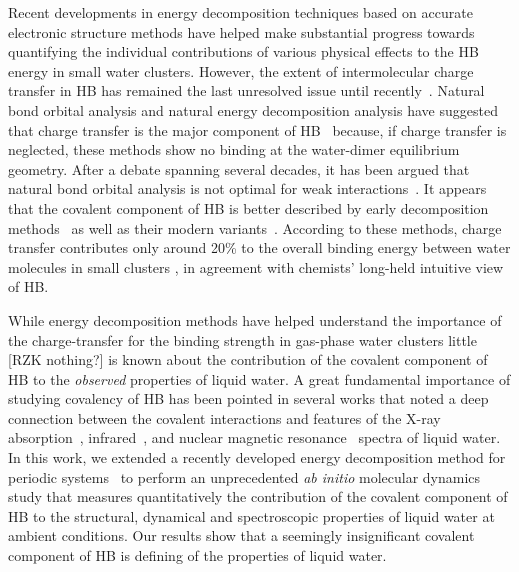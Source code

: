 \documentclass[aps,prl,reprint,amsmath,amssymb]{revtex4-1}
\begin{document}
Recent developments in energy decomposition techniques based on accurate electronic structure methods have helped make substantial progress towards quantifying the individual contributions of various physical effects to the HB energy in small water clusters. However, the extent of intermolecular charge transfer in HB has remained the last unresolved issue until recently~\cite{isaacs1999covalency,ghanty2000hydrogen,stone2017natural}. Natural bond orbital analysis\cite{weinhold1998natural} and natural energy decomposition analysis \cite{glendening1994natural} have suggested that charge transfer is the major component of HB~\cite{schenter1996natural,glendening2005natural,weinhold2005resonance} because, if charge transfer is neglected, these methods show no binding at the water-dimer equilibrium geometry. After a debate spanning several decades, it has been argued that natural bond orbital analysis is not optimal for weak interactions~\cite{stone2017natural}. It appears that the covalent component of HB is better described by early decomposition methods~\cite{kitaura1976new,bagus1984new,bagus1992decomposition,stevens1987frozen,chen1996energy,ZZZ-SAPT} as well as their modern variants~\cite{mo2000energy,misquitta2003dispersion,khaliullin2007unravelling}. According to these methods, charge transfer contributes only around 20\% to the overall binding energy between water molecules in small clusters \cite{stevens1987frozen,chen1996energy,piquemal2005csov,khaliullin2009electron,cobar2012examination}, in agreement with chemists' long-held intuitive view of HB.

While energy decomposition methods have helped understand the importance of the charge-transfer for the binding strength in gas-phase water clusters little [RZK nothing?] is known about the contribution of the covalent component of HB to the \emph{observed} properties of liquid water. A great fundamental importance of studying covalency of HB has been pointed in several works that  noted a deep connection between the covalent interactions and features of the X-ray absorption~\cite{NatureComm2013}, infrared~\cite{JPCL2013}, and nuclear magnetic resonance~\cite{NatureComm2015} spectra of liquid water. In this work, we extended a recently developed energy decomposition method for periodic systems~\cite{Khaliullin2013JCTC} to perform an unprecedented \emph{ab initio} molecular dynamics study that measures quantitatively the contribution of the covalent component of HB to the structural, dynamical and spectroscopic properties of liquid water at ambient conditions. Our results show that a seemingly insignificant covalent component of HB is defining of the properties of liquid water. %
\end{document}
